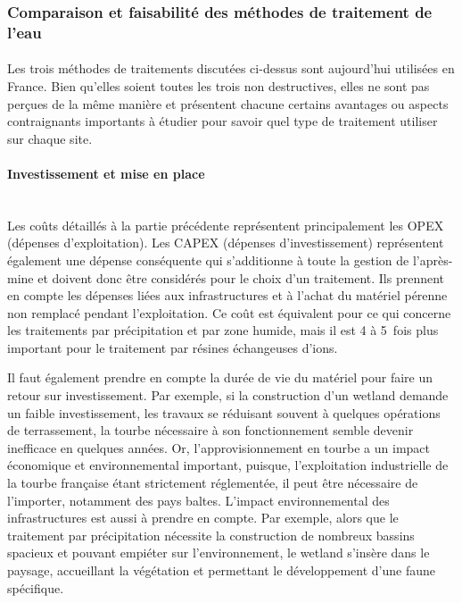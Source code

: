 \documentclass{article}
\begin{document}
\subsubsection{Comparaison et faisabilité des méthodes de traitement de l'eau}
\paragraph{} Les trois méthodes de traitements discutées ci-dessus sont aujourd’hui utilisées en France. Bien qu’elles soient toutes les trois non destructives, elles ne sont pas perçues de la même manière et présentent chacune certains avantages ou aspects contraignants importants à étudier pour savoir quel type de traitement utiliser sur chaque site.

\paragraph{Investissement et mise en place \\ \\}

Les coûts détaillés à la partie précédente représentent principalement les OPEX (dépenses d’exploitation). Les CAPEX (dépenses d’investissement) représentent également une dépense conséquente qui s'additionne à toute la gestion de l’après-mine et doivent donc être considérés pour le choix d'un traitement. Ils prennent en compte les dépenses liées aux infrastructures et à l’achat du matériel pérenne non remplacé pendant l’exploitation. Ce coût est équivalent pour ce qui concerne les traitements par précipitation et par zone humide, mais il est 4 à 5~fois plus important pour le traitement par résines échangeuses d’ions.

Il faut également prendre en compte la durée de vie du matériel pour faire un retour sur investissement. Par exemple, si la construction d’un wetland demande un faible investissement, les travaux se réduisant souvent à quelques opérations de terrassement, la tourbe nécessaire à son fonctionnement semble devenir inefficace en quelques années. Or, l’approvisionnement en tourbe a un impact économique et environnemental important, puisque, l’exploitation industrielle de la tourbe française étant strictement réglementée, il peut être nécessaire de l’importer, notamment des pays baltes. L’impact environnemental des infrastructures est aussi à prendre en compte. Par exemple, alors que le traitement par précipitation nécessite la construction de nombreux bassins spacieux et pouvant empiéter sur l’environnement, le wetland s’insère dans le paysage, accueillant la végétation et permettant le développement d’une faune spécifique.
\end{document}
